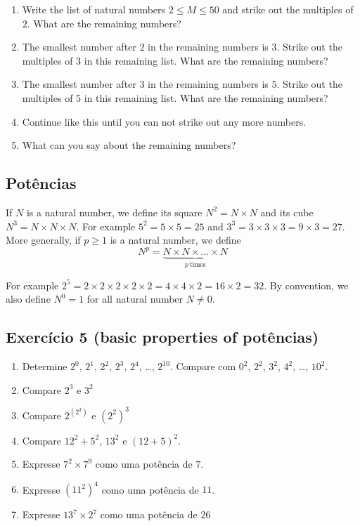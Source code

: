 \begin{enumerate}
\item Write the list of natural numbers $2 \leq M \leq 50$ and strike out the
  multiples of $2$. What are the remaining numbers?
\item The smallest number after $2$ in the remaining numbers is $3$.
  Strike out the multiples of $3$ in this remaining list.
  What are the remaining numbers?
\item The smallest number after $3$ in the remaining numbers is $5$.
  Strike out the multiples of $5$ in this remaining list.
  What are the remaining numbers?
\item Continue like this until you can not strike out any more numbers.
\item What can you say about the remaining numbers?
\end{enumerate}

\subsection*{Potências}

If $N$ is a natural number, we define its square $N^2 = N \times N$ and
its cube $N^3 = N \times N \times N$. For example $5^2 = 5 \times 5 = 25$ and
$3^3 = 3 \times 3 \times 3 = 9 \times 3 = 27$. More generally, if $p \geq 1$ is
a natural number, we define
$$N^p =
\underset{p\,\text{times}}{\underbrace{N \times N \times \ldots \times N}}$$

For example $2^5 = 2 \times 2 \times 2 \times 2 \times 2 = 4 \times 4 \times 2
= 16 \times 2 = 32$.
By convention, we also define $N^0 = 1$ for all natural number $N \neq 0$.

\subsection*{Exercício 5 (basic properties of potências)}

\begin{enumerate}
\item Determine $2^0$, $2^1$, $2^2$, $2^3$, $2^4$, \ldots, $2^{10}$. Compare com
$0^2$, $2^2$, $3^2$, $4^2$, \ldots, $10^2$.
\item Compare $2^3$ e $3^2$
\item Compare $2^{\left(2^3\right)}$ e ${\left(2^2\right)}^3$
\item Compare $12^2 + 5^2$, $13^2$ e $\left(12+5\right)^2$.
\item Expresse $7^2 \times 7^9$ como uma potência de $7$.
\item Expresse $\left(11^{2}\right)^4$ como uma potência de $11$.
\item Expresse $13^7 \times 2^7$ como uma potência de $26$
\end{enumerate}

